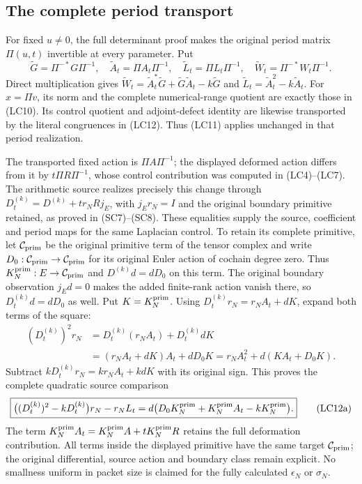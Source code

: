 \documentclass{article}
\begin{document}
\subsection{The complete period transport}

For fixed \(u\ne0\), the full determinant proof makes the original
period matrix \(\Pi(u,t)\) invertible at every parameter. Put
\[
 \widetilde G=\Pi^{-*}G\Pi^{-1},\quad
 \widetilde A_t=\Pi A_t\Pi^{-1},\quad
 \widetilde L_t=\Pi L_t\Pi^{-1},\quad
 \widetilde W_t=\Pi^{-*}W_t\Pi^{-1}.
 \tag{LC12}
\]
Direct multiplication gives
\(\widetilde W_t=\widetilde A_t^*\widetilde G+
\widetilde G\widetilde A_t-k\widetilde G\) and
\(\widetilde L_t=\widetilde A_t^2-k\widetilde A_t\).
For \(x=\Pi v\), its norm and the complete numerical-range quotient
are exactly those in (LC10). Its control quotient and adjoint-defect
identity are likewise transported by the literal congruences in
(LC12). Thus (LC11) applies unchanged in that period realization.

The transported fixed action is \(\Pi A\Pi^{-1}\); the displayed
deformed action differs from it by \(t\Pi R\Pi^{-1}\), whose
control contribution was computed in (LC4)--(LC7). The arithmetic
source realizes precisely this change through
\(D_t^{(k)}=D^{(k)}+t r_NRj_E\), with
\(j_Er_N=I\) and the original boundary primitive retained, as
proved in (SC7)--(SC8). These equalities supply the source,
coefficient and period maps for the same Laplacian control.
To retain its complete primitive, let $\mathcal C_{\rm prim}$
be the original primitive term of the tensor complex and write
$D_0:\mathcal C_{\rm prim}\to\mathcal C_{\rm prim}$ for its
original Euler action of cochain degree zero. Thus
$K_N^{\rm prim}:E\to\mathcal C_{\rm prim}$ and
$D^{(k)}d=dD_0$ on this term. The original boundary observation
$j_Ed=0$ makes the added finite-rank action vanish there, so
$D_t^{(k)}d=dD_0$ as well. Put $K=K_N^{\rm prim}$.
Using $D_t^{(k)}r_N=r_NA_t+dK$, expand both terms of the square:
\[
\begin{split}
 (D_t^{(k)})^2r_N
 &=D_t^{(k)}(r_NA_t)+D_t^{(k)}dK\\
 &=(r_NA_t+dK)A_t+dD_0K
   =r_NA_t^2+d(KA_t+D_0K).
\end{split}
\]
Subtract $kD_t^{(k)}r_N=kr_NA_t+kdK$ with its original sign.
This proves the complete quadratic source comparison
\[
 \boxed{\bigl((D_t^{(k)})^2-kD_t^{(k)}\bigr)r_N-r_NL_t
       =d\bigl(D_0K_N^{\rm prim}+K_N^{\rm prim}A_t
                                      -kK_N^{\rm prim}\bigr).}
 \tag{LC12a}
\]
The term $K_N^{\rm prim}A_t=K_N^{\rm prim}A+
tK_N^{\rm prim}R$ retains the full deformation contribution.
All terms inside the displayed primitive have the same target
$\mathcal C_{\rm prim}$; the original differential, source action
and boundary class remain explicit.
No smallness uniform in packet size is claimed for the fully
calculated \(\epsilon_N\) or \(\sigma_N\).
\end{document}
